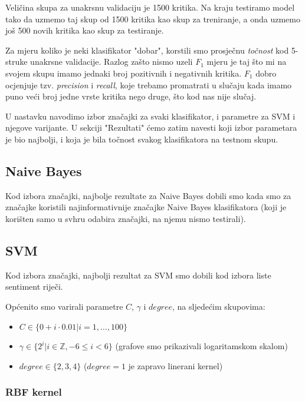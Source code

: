 \documentclass[conference]{IEEEtran}
\begin{document}
Veličina skupa za unakrsnu validaciju je 1500 kritika. Na kraju testiramo
model tako da uzmemo taj skup od 1500 kritika kao skup za treniranje, a onda
uzmemo još 500 novih kritika kao skup za testiranje.

Za mjeru koliko je neki klasifikator "dobar", korstili smo prosječnu
\textit{točnost} kod 5-struke unakrsne validacije. Razlog zašto nismo uzeli
$F_1$ mjeru je taj što mi na svojem skupu imamo jednaki broj pozitivnih i
negativnih kritika. $F_1$ dobro ocjenjuje tzv. \textit{precision} i
\textit{recall}, koje trebamo promatrati u slučaju kada imamo puno veći broj
jedne vrste kritika nego druge, što kod nas nije slučaj.

U nastavku navodimo izbor značajki za svaki klasifikator, i parametre za SVM
i njegove varijante. U sekciji "Rezultati" ćemo zatim navesti koji izbor
parametara je bio najbolji, i koja je bila točnost svakog klasifikatora na
testnom skupu.

\subsection{Naive Bayes}

Kod izbora značajki, najbolje rezultate za Naive Bayes dobili smo
kada smo za značajke koristili najinformativnije značajke Naive Bayes
klasifikatora (koji je korišten samo u svhru odabira značajki, na njemu nismo
testirali).

\subsection{SVM}

Kod izbora značajki, najbolji rezultat za SVM smo dobili kod izbora liste
sentiment riječi.

Općenito smo varirali parametre $C$, $\gamma$ i $degree$, na sljedećim skupovima:

\begin{itemize}
  \item $C \in \{0 + i \cdot 0.01 | i = 1,\ldots,100\}$
  \item $\gamma \in \{2^i| i \in \mathbb{Z}, -6 \leq i <6 \}$ (grafove smo
    prikazivali logaritamskom skalom)
  \item $degree \in \{2,3,4\}$ ($degree = 1$ je zapravo linerani kernel)
\end{itemize}

\subsubsection{RBF kernel}
\end{document}
